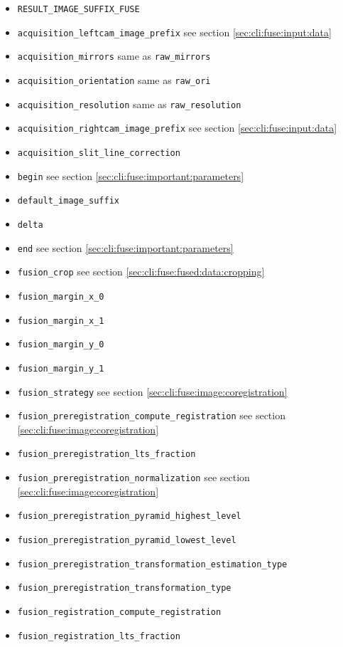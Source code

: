 \begin{itemize}
\item \texttt{RESULT\_IMAGE\_SUFFIX\_FUSE}
\item \texttt{acquisition\_leftcam\_image\_prefix}  see section \ref{sec:cli:fuse:input:data}
\item \texttt{acquisition\_mirrors} same as \texttt{raw\_mirrors}
\item \texttt{acquisition\_orientation} same as \texttt{raw\_ori}
\item \texttt{acquisition\_resolution} same as \texttt{raw\_resolution}
\item \texttt{acquisition\_rightcam\_image\_prefix}  see section \ref{sec:cli:fuse:input:data}
\item \texttt{acquisition\_slit\_line\_correction}
\item \texttt{begin} see section \ref{sec:cli:fuse:important:parameters}
\item \texttt{default\_image\_suffix}
\item \texttt{delta}
\item \texttt{end} see section \ref{sec:cli:fuse:important:parameters}
\item \texttt{fusion\_crop} see section \ref{sec:cli:fuse:fused:data:cropping}
\item \texttt{fusion\_margin\_x\_0}
\item \texttt{fusion\_margin\_x\_1}
\item \texttt{fusion\_margin\_y\_0}
\item \texttt{fusion\_margin\_y\_1}
\item \texttt{fusion\_strategy}  see section \ref{sec:cli:fuse:image:coregistration}
\item \texttt{fusion\_preregistration\_compute\_registration} see section \ref{sec:cli:fuse:image:coregistration}
\item \texttt{fusion\_preregistration\_lts\_fraction}
\item \texttt{fusion\_preregistration\_normalization} see section \ref{sec:cli:fuse:image:coregistration}
\item \texttt{fusion\_preregistration\_pyramid\_highest\_level}
\item \texttt{fusion\_preregistration\_pyramid\_lowest\_level}
\item \texttt{fusion\_preregistration\_transformation\_estimation\_type}
\item \texttt{fusion\_preregistration\_transformation\_type}
\item \texttt{fusion\_registration\_compute\_registration}
\item \texttt{fusion\_registration\_lts\_fraction}

\end{itemize}
